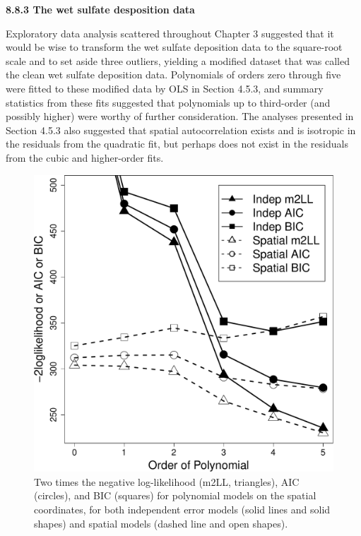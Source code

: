 \documentclass[12pt, titlepage]{article}
\begin{document}
\setcounter{equation}{0}
\renewcommand{\theequation}{R.\arabic{equation}}


%
%

{\large \flushleft \textbf{8.8.3 The wet sulfate desposition data}}

\vspace{.3cm}

Exploratory data analysis scattered throughout Chapter 3 suggested that it would be wise to transform the wet sulfate deposition data to the square-root scale and to set aside three outliers, yielding a modified dataset that was called the clean wet sulfate deposition data.  Polynomials of orders zero through five were fitted to these modified data by OLS in Section 4.5.3, and summary statistics from these fits suggested that polynomials up to third-order (and possibly higher) were worthy of further consideration.  The analyses presented in Section 4.5.3 also suggested that spatial autocorrelation exists and is isotropic in the residuals from the quadratic fit, but perhaps does not exist in the residuals from the cubic and higher-order fits.

\begin{figure}[H]
  \begin{center}
	    \includegraphics[width=.6\linewidth]{SO4_AIC}
  \end{center}
  \caption{Two times the negative log-likelihood (m2LL, triangles), AIC (circles), and BIC (squares) for polynomial models on the spatial coordinates, for both independent error models (solid lines and solid shapes) and spatial models (dashed line and open shapes). \label{Fig:SO4_AIC}}
\end{figure}
\end{document}
